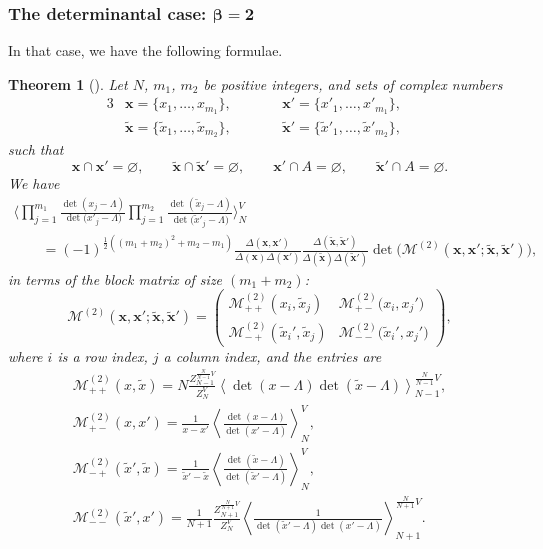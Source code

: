 \documentclass[10pt,a4paper]{amsart}
\numberwithin{equation}{section}
\newtheorem{Theorem}{Theorem}[section]
\newcommand{\mean}[1]{\left\langle{#1}\right\rangle}
\begin{document}
\subsubsection[The determinantal case: beta = 2]{The determinantal case: $\boldsymbol{\beta = 2}$}
In that case, we have the following formulae.
\begin{Theorem}[{\cite[Theorem 4.1.1]{borodin_averages}}]
 \label{beta2form} Let $N$, $m_1$, $m_2$ be positive integers, and sets of complex numbers
 \begin{alignat*}{3}
 &\bm{x} = \{x_{1}, \ldots, x_{m_{1}}\},\qquad && \bm{x}' = \bigl\{x'_{1}, \dots, x'_{m_{1}}\bigr\}, &\\
 &\tilde{\bm{x}} = \{\tilde{x}_{1}, \ldots, \tilde{x}_{m_{2}}\},\qquad && \tilde{\bm{x}}' = \bigl\{\tilde{x}'_{1}, \dots, \tilde{x}'_{m_{2}}\bigr\}, &
 \end{alignat*}
 such that
 \begin{equation*}
 \bm{x} \cap \bm{x}' = \varnothing,\qquad\bm{\tilde{x}} \cap \bm{\tilde{x}}'=\varnothing,\qquad\bm{x}' \cap A = \varnothing,\qquad \bm{\tilde{x}}' \cap A = \varnothing.
 \end{equation*}
 We have
 \begin{gather*}%
 \Biggl\langle\prod_{j=1}^{m_{1}} \frac{\det(x_{j} - \Lambda)}{\det\bigl(x'_{j} - \Lambda\bigr)}\prod_{j=1}^{m_{2}}\frac{\det(\tilde{x}_{j} - \Lambda)}{\det\bigl(\tilde{x}'_{j} - \Lambda\bigr)}\Biggr\rangle_{N}^{V}\\
 \qquad  = (-1)^{\frac{1}{2}((m_{1}+m_{2})^{2} + m_{2} - m_{1})}\frac{\Delta(\bm{x}, \bm{x}')}{\Delta(\bm{x})\Delta(\bm{x}')}\frac{\Delta(\tilde{\bm{x}},\tilde{\bm{x}}')}{\Delta(\tilde{\bm{x}})\Delta(\tilde{\bm{x}}')}
 \det\bigl(\mathcal{M}^{(2)}(\bm{x},\bm{x}';\tilde{\bm{x}},\tilde{\bm{x}}')\bigr),
 \end{gather*}
 in terms of the block matrix of size $(m_1 + m_2)$:
 \[
 \mathcal{M}^{(2)}(\bm{x},\bm{x}';\tilde{\bm{x}},\tilde{\bm{x}}') = \begin{pmatrix} \mathcal{M}^{(2)}_{++}(x_i,\tilde{x}_j) & \mathcal{M}^{(2)}_{+-}\big(x_i,x_j'\big) \\ \mathcal{M}_{-+}^{(2)}(\tilde{x}_i',\tilde{x}_j) & \mathcal{M}^{(2)}_{--}\big(\tilde{x}_i',x_j'\big)\end{pmatrix},
 \]
where $i$ is a row index, $j$ a column index, and the entries are
\begin{gather*}%
 \mathcal{M}_{++}^{(2)}(x, \tilde{x}) = N\frac{Z_{N-1}^{\frac{N}{N-1}V}}{Z_{N}^{V}}\mean{\det(x - \Lambda)\det(\tilde{x} - \Lambda)}_{N-1}^{\frac{N}{N-1}V},\\
 \mathcal{M}^{(2)}_{+-}(x, x') = \frac{1}{x-x'}\mean{\frac{\det(x - \Lambda)}{\det(x' - \Lambda)}}_{N}^{V},\\
 \mathcal{M}^{(2)}_{-+}(\tilde{x}',\tilde{x}) = \frac{1}{\tilde{x}' - \tilde{x}}\mean{\frac{\det(\tilde{x} - \Lambda)}{\det(\tilde{x}' - \Lambda)}}_{N}^{V},\\
 \mathcal{M}^{(2)}_{--}(\tilde{x}', x') = \frac{1}{N+1}\frac{Z_{N+1}^{\frac{N}{N+1}V}}{Z_{N}^{V}}\mean{\frac{1}{\det(\tilde{x}' - \Lambda)\det(x' - \Lambda)}}_{N+1}^{\frac{N}{N+1}V}.
 \end{gather*}
\end{Theorem}
\end{document}
